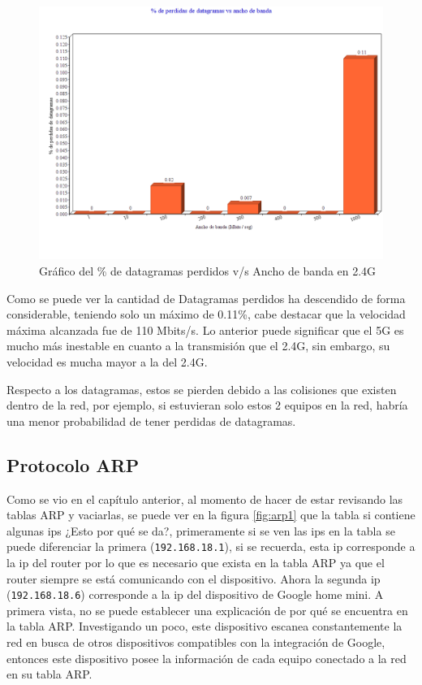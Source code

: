 \begin{figure}[!h]
	\centering
	\includegraphics[scale=0.5]{images/barplots.png}
	\caption{Gráfico del \% de datagramas perdidos v/s Ancho de banda en 2.4G}
	\label{diag:iperf3}
\end{figure}

\noindent Como se puede ver la cantidad de Datagramas perdidos ha descendido de forma considerable, teniendo solo un máximo de 0.11\%, cabe destacar que la velocidad máxima alcanzada fue de 110 Mbits/s. Lo anterior puede significar que el 5G es mucho más inestable en cuanto a la transmisión que el 2.4G, sin embargo, su velocidad es mucha mayor a la del 2.4G.

\newline

\noindent Respecto a los datagramas, estos se pierden debido a las colisiones que existen dentro de la red, por ejemplo, si estuvieran solo estos 2 equipos en la red, habría una menor probabilidad de tener perdidas de datagramas. 

\subsection{Protocolo ARP}

Como se vio en el capítulo anterior, al momento de hacer de estar revisando las tablas ARP y vaciarlas, se puede ver en la figura \ref{fig:arp1} que la tabla si contiene algunas ips ¿Esto por qué se da?, primeramente si se ven las ips en la tabla se puede diferenciar la primera (\verb|192.168.18.1|), si se recuerda, esta ip corresponde a la ip del router por lo que es necesario que exista en la tabla ARP ya que el router siempre se está comunicando con el dispositivo.  Ahora la segunda ip (\verb|192.168.18.6|) corresponde a la ip del dispositivo de Google home mini. A primera vista, no se puede establecer una explicación de por qué se encuentra en la tabla ARP. Investigando un poco, este dispositivo escanea constantemente la red en busca de otros dispositivos compatibles con la integración de Google, entonces este dispositivo posee la información de cada equipo conectado a la red en su tabla ARP. 
\newline


